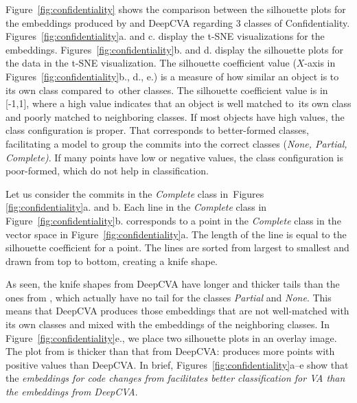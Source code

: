 Figure~\ref{fig:confidentiality} shows the comparison between the
silhouette plots for the embeddings produced by {\tool} and DeepCVA
regarding 3 classes of
Confidentiality. Figures~\ref{fig:confidentiality}a. and c. display
the t-SNE visualizations for the embeddings.
Figures~\ref{fig:confidentiality}b. and d. display the silhouette
plots for the data in the t-SNE visualization.
The silhouette coefficient value ($X$-axis in
Figures~\ref{fig:confidentiality}b., d., e.) is a measure of how
similar an object is to its own class compared to~other classes. The
silhouette coefficient value is in [-1,1], where a high value
indicates that an object is well matched to~its own class and poorly
matched to neighboring classes. If most objects have high values, the
class configuration is proper. That corresponds
to better-formed classes, facilitating a model to group the commits
into the correct classes ({\em None, Partial, Complete)}.
If many points have low or negative values, the
class configuration is poor-formed, which do not help in
classification.

Let us consider the commits in the {\em Complete} class
in~Figures \ref{fig:confidentiality}a. and b. Each line in the {\em
Complete} class in Figure~\ref{fig:confidentiality}b. corresponds to a
point in the {\em Complete} class in the vector space in
Figure~\ref{fig:confidentiality}a. The length of the line is equal to
the silhouette coefficient for a point. The lines are
sorted from largest to smallest and drawn from top to bottom, creating
a knife shape.

As seen, the knife shapes from DeepCVA have longer and thicker
tails than the ones from {\tool}, which actually have no tail for the
classes {\em Partial} and {\em None}. This means that DeepCVA produces
those embeddings that are not well-matched with its own classes and
mixed with the embeddings of the neighboring classes. In
Figure~\ref{fig:confidentiality}e., we place two silhouette plots in
an overlay image. The plot from {\tool} is thicker than that from
DeepCVA: {\tool} produces more points with positive values than
DeepCVA. In brief, Figures~\ref{fig:confidentiality}a--e show that the
{\em embeddings for code changes from {\tool} facilitates better
classification for VA than the embeddings from DeepCVA}.



